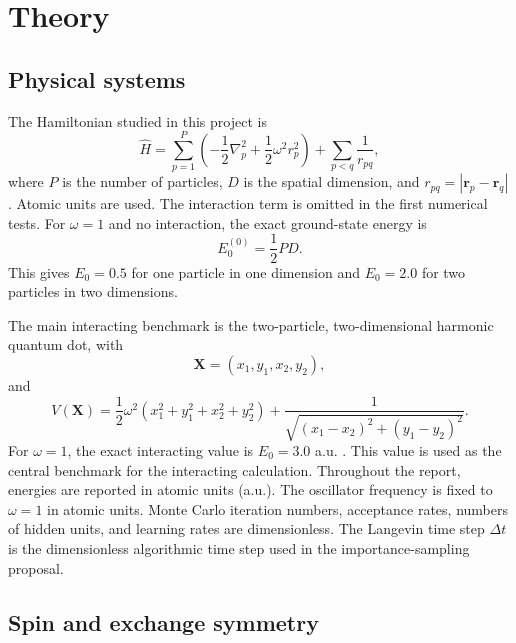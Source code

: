 \documentclass[10pt,a4paper]{article}
\newcommand{\bX}{\mathbf{X}}
\newcommand{\br}{\mathbf{r}}
\begin{document}
\section{Theory}\label{sec:theory}

\subsection{Physical systems}

The Hamiltonian studied in this project is
\begin{equation}
\hat{H}
=
\sum_{p=1}^{P}
\left(
-\frac{1}{2}\nabla_p^2+\frac{1}{2}\omega^2 r_p^2
\right)
+
\sum_{p<q}\frac{1}{r_{pq}},
\label{eq:hamiltonian}
\end{equation}
where $P$ is the number of particles, $D$ is the spatial dimension, and $r_{pq}=|\br_p-\br_q|$. Atomic units are used. The interaction term is omitted in the first numerical tests. For $\omega=1$ and no interaction, the exact ground-state energy is
\begin{equation}
E_0^{(0)}=\frac{1}{2}PD.
\label{eq:noninteracting-benchmark}
\end{equation}
This gives $E_0=0.5$ for one particle in one dimension and $E_0=2.0$ for two particles in two dimensions.

The main interacting benchmark is the two-particle, two-dimensional harmonic quantum dot, with
\begin{equation}
\bX=(x_1,y_1,x_2,y_2),
\end{equation}
and
\begin{equation}
V(\bX)=\frac{1}{2}\omega^2(x_1^2+y_1^2+x_2^2+y_2^2)
+
\frac{1}{\sqrt{(x_1-x_2)^2+(y_1-y_2)^2}}.
\label{eq:2p2d-potential}
\end{equation}
For $\omega=1$, the exact interacting value is $E_0=3.0$ a.u. \cite{taut1993}. This value is used as the central benchmark for the interacting calculation. Throughout the report, energies are reported in atomic units (a.u.). The oscillator frequency is fixed to $\omega=1$ in atomic units. Monte Carlo iteration numbers, acceptance rates, numbers of hidden units, and learning rates are dimensionless. The Langevin time step $\Delta t$ is the dimensionless algorithmic time step used in the importance-sampling proposal.

\subsection{Spin and exchange symmetry}
\end{document}
